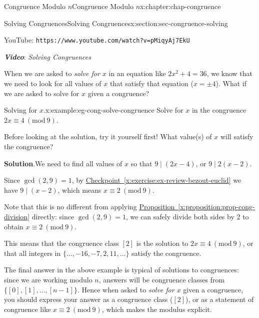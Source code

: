 \documentclass[oneside,10pt,]{book}
\newcommand{\blocktitlefont}{\relax}
\newcommand{\xreffont}{\relax}
\newcommand{\mono}[1]{\texttt{#1}}
\newcommand{\alert}[1]{\textbf{\textit{#1}}}
\numberwithin{equation}{section}
\newlength{\qrsize}
\newlength{\previewwidth}
\newcommand{\Mod}[1]{\ \left(\mathrm{mod}\ #1\right)}
\begin{document}
\begin{chapterptx}{Congruence Modulo \(n\)}{}{Congruence Modulo \(n\)}{}{}{x:chapter:chap-congruence}
\begin{sectionptx}{Solving Congruences}{}{Solving Congruences}{}{}{x:section:sec-congruence-solving}
\begin{sidebyside}{1}{0}{0}{0}
\begin{sbspanel}{1}
\begin{tcbraster}[raster columns=2, raster column skip=1pt, raster halign=center, raster force size=false, raster left skip=0pt, raster right skip=0pt]
\begin{tcolorbox}[previewstyle, width=\previewwidth]
\end{tcolorbox}%
\begin{tcolorbox}[qrstyle]%
{\hypersetup{urlcolor=black}}%
\end{tcolorbox}%
\begin{tcolorbox}[captionstyle]%
\small YouTube: \mono{https://www.youtube.com/watch?v=pMiqyAj7EkU}\end{tcolorbox}%
\end{tcbraster}%
\end{sbspanel}%
\end{sidebyside}%
\par
\alert{Video}: \emph{Solving Congruences}%
\par
When we are asked to \emph{solve for \(x\)} in an equation like \(2x^2 + 4 = 36\), we know that we need to look for all values of \(x\) that satisfy that equation (\(x = \pm 4\)). What if we are asked to solve for \(x\) given a congruence?%
\begin{example}{Solving for \(x\).}{x:example:eg-cong-solve-congruence}%
Solve for \(x\) in the congruence \(2x \equiv 4 \Mod{9}\).%
\par
Before looking at the solution, try it yourself first! What value(s) of \(x\) will satisfy the congruence?%
\par\smallskip%
\noindent\textbf{\blocktitlefont Solution}.\hypertarget{g:solution:id538144}{}\quad{}We need to find all values of \(x\) so that \(9 \mid (2x - 4)\), or \(9 \mid 2(x-2)\).%
\par
Since \(\gcd(2,9) = 1\), by \hyperref[x:exercise:ex-review-bezout-euclid]{Checkpoint~{\xreffont\ref{x:exercise:ex-review-bezout-euclid}}} we have \(9 \mid (x-2)\), which means \(x \equiv 2 \Mod{9}\).%
\par
Note that this is no different from applying \hyperref[x:proposition:prop-cong-division]{Proposition~{\xreffont\ref{x:proposition:prop-cong-division}}} directly: since \(\gcd(2,9) = 1\), we can safely divide both sides by 2 to obtain \(x \equiv 2 \Mod{9}\).%
\par
This means that the congruence class \([2]\) is the solution to \(2x \equiv 4 \Mod{9}\), or that all integers in \(\{\ldots,-16,-7,2,11,\ldots\}\) satisfy the congruence.%
\end{example}
The final answer in the above example is typical of solutions to congruences: since we are working modulo \(n\), answers will be congruence classes from \(\{[0],[1],\ldots,[n-1]\}\). Hence when asked to \emph{solve for \(x\)} given a congruence, you should express your answer as a congruence class (\([2]\)), or as a statement of congruence like \(x \equiv 2 \Mod{9}\), which makes the modulus explicit.%

\end{sectionptx}
\end{chapterptx}
\end{document}

